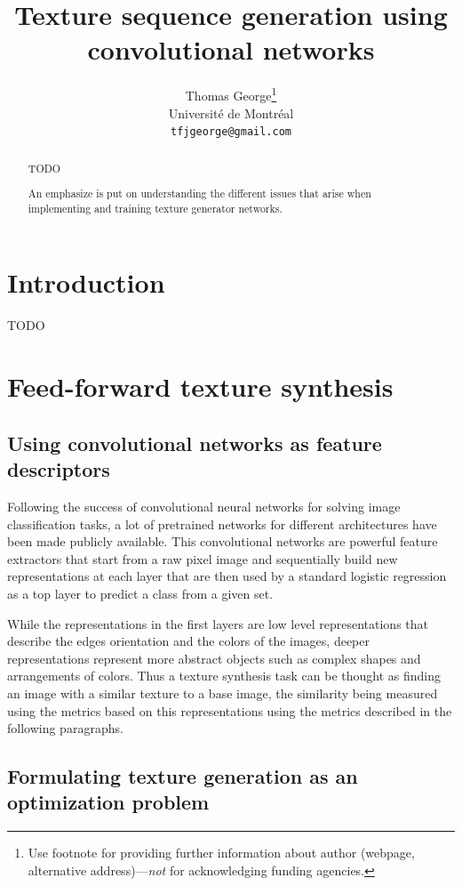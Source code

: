 \documentclass{article}
\title{Texture sequence generation using convolutional networks}
\author{
  Thomas George\thanks{Use footnote for providing further
    information about author (webpage, alternative
    address)---\emph{not} for acknowledging funding agencies.} \\
  Université de Montréal\\
  \texttt{tfjgeorge@gmail.com} \\
}
\begin{document}

\maketitle

\begin{abstract}
  TODO
  
  An emphasize is put on understanding the different issues that arise when implementing and training texture generator networks.
\end{abstract}

\section{Introduction}

TODO

\section{Feed-forward texture synthesis}

\subsection{Using convolutional networks as feature descriptors}

Following the success of convolutional neural networks for solving image classification tasks, a lot of pretrained networks for different architectures have been made publicly available. This convolutional networks are powerful feature extractors that start from a raw pixel image and sequentially build new representations at each layer that are then used by a standard logistic regression as a top layer to predict a class from a given set.

While the representations in the first layers are low level representations that describe the edges orientation and the colors of the images, deeper representations represent more abstract objects such as complex shapes and arrangements of colors. Thus a texture synthesis task can be thought as finding an image with a similar texture to a base image, the similarity being measured using the metrics based on this representations using the metrics described in the following paragraphs.

\subsection{Formulating texture generation as an optimization problem}
\end{document}
